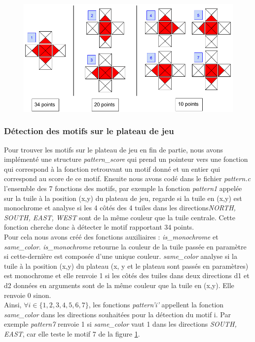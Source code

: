 \documentclass[11pt]{article}
\begin{document}
\begin{figure}[H] 
\centering
\includegraphics[scale=0.5]{Ensemble des motifs.png}
\label{fig : motifs}
\end{figure}

\subsubsection{Détection des motifs sur le plateau de jeu}
Pour trouver les motifs sur le plateau de jeu en fin de partie, nous avons implémenté une structure \emph{pattern\_score} qui prend un pointeur vers une fonction qui correspond à la fonction retrouvant un motif donné et un entier qui correspond au score de ce motif. Ensuite nous avons codé dans le fichier \emph{pattern.c} l'ensemble des 7 fonctions des motifs, par exemple la fonction \emph{pattern1} appelée sur la tuile à la position (x,y) du plateau de jeu, regarde si la tuile en (x,y) est monochrome et analyse si les 4 côtés des 4 tuiles dans les directions\emph{NORTH, SOUTH, EAST, WEST} sont de la même couleur que la tuile centrale. Cette fonction cherche donc à détecter le motif rapportant 34 points.\\

Pour cela nous avons créé des fonctions auxiliaires : \emph{is\_monochrome} et \emph{same\_color}.
\emph{is\_monochrome} retourne la couleur de la tuile passée en paramètre si cette-dernière est composée d'une unique couleur.
\emph{same\_color} analyse si la tuile à la position (x,y) du plateau (x, y et le plateau sont passés en paramètres) est monochrome et elle renvoie 1 si les côtés des tuiles dans deux directions d1 et d2 données en arguments sont de la même couleur que la tuile en (x,y). Elle renvoie 0 sinon. \\

Ainsi, \( \forall i \in {\{1,2,3,4,5,6,7\}} \), les fonctions \emph{pattern'i'} appellent la fonction \emph{same\_color} dans les directions souhaitées pour la détection du motif i. Par exemple \emph{pattern7} renvoie 1 si \emph{same\_color} vaut 1 dans les directions \emph{SOUTH, EAST}, car elle teste le motif 7 de la figure \ref{fig : motifs}.
\end{document}
